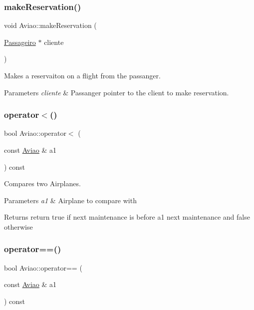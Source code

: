 \subsubsection{\texorpdfstring{make\+Reservation()}{makeReservation()}}
{\footnotesize\ttfamily void Aviao\+::make\+Reservation (\begin{DoxyParamCaption}\item[{\hyperlink{class_passageiro}{Passageiro} $\ast$}]{cliente }\end{DoxyParamCaption})}



Makes a reservaiton on a flight from the passanger. 


\begin{DoxyParams}{Parameters}
{\em cliente} & Passanger pointer to the client to make reservation. \\
\hline
\end{DoxyParams}
\mbox{\label{class_aviao_a9b17b2c6c7eebba95a37d5b1ba3bf612}} 
\subsubsection{\texorpdfstring{operator$<$()}{operator<()}}
{\footnotesize\ttfamily bool Aviao\+::operator$<$ (\begin{DoxyParamCaption}\item[{const \hyperlink{class_aviao}{Aviao} \&}]{a1 }\end{DoxyParamCaption}) const}



Compares two Airplanes. 


\begin{DoxyParams}{Parameters}
{\em a1} & Airplane to compare with\\
\hline
\end{DoxyParams}
\begin{DoxyReturn}{Returns}
return true if next maintenance is before a1 next maintenance and false otherwise 
\end{DoxyReturn}
\mbox{\label{class_aviao_a9b072dd9fd5c3de4048ce80072a35d62}} 
\subsubsection{\texorpdfstring{operator==()}{operator==()}}
{\footnotesize\ttfamily bool Aviao\+::operator== (\begin{DoxyParamCaption}\item[{const \hyperlink{class_aviao}{Aviao} \&}]{a1 }\end{DoxyParamCaption}) const}



